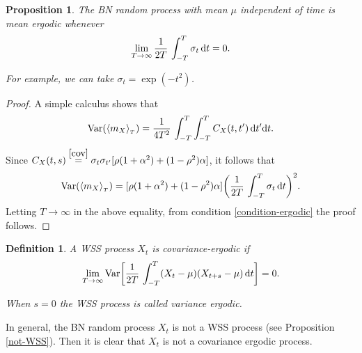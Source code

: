 \documentclass[12pt]{article}
\newtheorem{proposition}[theorem]{Proposition}
\newtheorem{definition}[theorem]{Definition}
\theoremstyle{definition}
\begin{document}
\begin{proposition}
The BN random process  with mean $\mu$ independent of time is mean ergodic whenever 
\begin{align}\label{condition-ergodic}
\lim_{T\to\infty}   {1\over 2T}\, \int_{-T}^{T} \sigma_t\, {\rm d} t=0.
\end{align}

For example, we can take $\sigma_t=\exp({-t^2})$.
\end{proposition}
\begin{proof}
A simple calculus shows that
\begin{align*}
{\rm Var}(\langle m_X\rangle_{_T})
=
{1\over 4T^2}\,
\int_{-T}^{T} \int_{-T}^{T} C_X(t,t')\, {\rm d} t' {\rm d} t.
\end{align*}
Since $C_X(t,s)\stackrel{\eqref{cov}}{=}\sigma_t\sigma_{t'}[
\rho(1+\alpha^2)+(1-\rho^2)\alpha]$, it follows that
\begin{align*}
{\rm Var}(\langle m_X\rangle_{_T})
=
[
\rho(1+\alpha^2)+(1-\rho^2)\alpha]
\biggl(
{1\over 2T}\,
\int_{-T}^{T} \sigma_t\, {\rm d} t
\biggr)^2.
\end{align*}
Letting $T\to\infty$ in the above equality, from condition \eqref{condition-ergodic} the proof follows.
\end{proof}

\begin{definition}
	A WSS process $X_t$ is covariance-ergodic if
	\begin{align*}
	\lim_{T\to\infty} 
	{\rm Var}\biggl[
	{1\over 2T}\, \int_{-T}^{T} (X_t-\mu)(X_{t+s}-\mu)\, {\rm d} t
	\biggr]
	=0.
	\end{align*}
	
When $s=0$ the WSS process is called variance ergodic.
\end{definition}

In general, the BN random process $X_t$ is not a WSS process (see Proposition \ref{not-WSS}). Then it is clear that $X_t$ is not a covariance ergodic process. 
\end{document}
